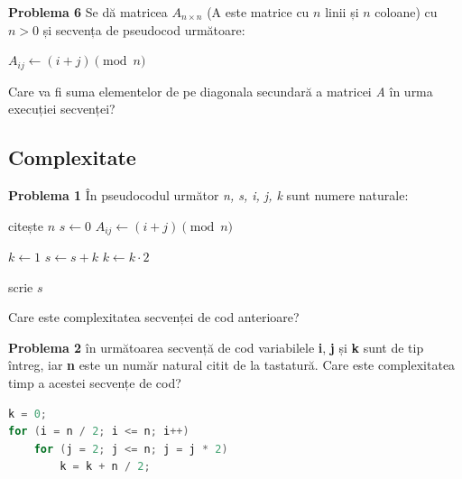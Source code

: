 \documentclass[11pt, a4paper]{article}
\begin{document}
\textbf{Problema 6}\newline
Se dă matricea $A_{n \times n}$ (A este matrice cu $n$ linii și $n$ coloane) cu $n > 0$ și secvența de pseudocod următoare:
\begin{algorithmic}

        \State $A_{ij} \gets (i+j) \pmod{n}$ 
    \EndFor
\EndFor

\end{algorithmic}
\noindent Care va fi suma elementelor de pe diagonala secundară a matricei \textit{A} în urma execuției secvenței?









\subsection{Complexitate}
\textbf{Problema 1}\newline
În pseudocodul următor \textit{n, s, i, j, k} sunt numere naturale:
\begin{algorithmic}
\State citește $n$
\State $s \gets 0$
        \State $A_{ij} \gets (i+j) \pmod{n}$
    \EndFor

    \State $k \gets 1$ 
        \State $s \gets s + k$
        \State $k \gets k \cdot 2$
    \EndWhile
\EndFor

\State scrie $s$

\end{algorithmic}
\noindent Care este complexitatea secvenței de cod anterioare?
\vspace{1cm}

\textbf{Problema 2}\newline
în următoarea secvență de cod variabilele \textbf{i}, \textbf{j} și \textbf{k} sunt de tip întreg, iar \textbf{n} este un număr natural citit de la tastatură. Care este complexitatea timp a acestei secvențe de cod?
\begin{lstlisting}[language=C++]
k = 0;
for (i = n / 2; i <= n; i++)
    for (j = 2; j <= n; j = j * 2)
        k = k + n / 2;
\end{lstlisting}
\end{document}
